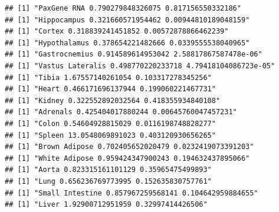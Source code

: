 \documentclass[]{article}
\newenvironment{Shaded}{\begin{snugshade}}{\end{snugshade}}
\newcommand{\KeywordTok}[1]{\textcolor[rgb]{0.13,0.29,0.53}{\textbf{#1}}}
\newcommand{\DataTypeTok}[1]{\textcolor[rgb]{0.13,0.29,0.53}{#1}}
\newcommand{\DecValTok}[1]{\textcolor[rgb]{0.00,0.00,0.81}{#1}}
\newcommand{\StringTok}[1]{\textcolor[rgb]{0.31,0.60,0.02}{#1}}
\newcommand{\OperatorTok}[1]{\textcolor[rgb]{0.81,0.36,0.00}{\textbf{#1}}}
\newcommand{\NormalTok}[1]{#1}
\begin{document}
\begin{Shaded}
\end{Shaded}

\begin{verbatim}
## [1] "PaxGene RNA 0.790279848326075 0.817156550332186"
## [1] "Hippocampus 0.321660571954462 0.00944810189048159"
## [1] "Cortex 0.318839241451852 0.00572878866462239"
## [1] "Hypothalamus 0.378654221482666 0.0339555538040965"
## [1] "Gastrocnemius 0.914589614953042 2.58817867587478e-06"
## [1] "Vastus Lateralis 0.498770220233718 4.79418104086723e-05"
## [1] "Tibia 1.67557140261054 0.103317278345256"
## [1] "Heart 0.466171696137944 0.199060221467731"
## [1] "Kidney 0.322552892032564 0.418355934840108"
## [1] "Adrenals 0.425404017880244 0.00645760047457231"
## [1] "Colon 0.54604928815029 0.0116198748828277"
## [1] "Spleen 13.0548069891023 0.403120930656265"
## [1] "Brown Adipose 0.702405652020479 0.0232419073391203"
## [1] "White Adipose 0.959424347900243 0.194632437895066"
## [1] "Aorta 0.823315161101129 0.35965475499893"
## [1] "Lung 0.656236769773995 0.152635830757761"
## [1] "Small Intestine 0.857967259568141 0.104642959884655"
## [1] "Liver 1.92900712951959 0.32997414426506"
\end{verbatim}
\end{document}
